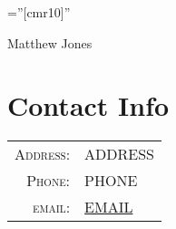 \documentclass[a4paper,10pt]{article}
\begin{document}

\pagestyle{empty} %

\font\fb=''[cmr10]'' %

\par{\centering
		{\Huge Matthew Jones
	}\bigskip\par}

\section{Contact Info}

\begin{tabular}{rl}
    \textsc{Address:}   & ADDRESS \\
    \textsc{Phone:}     & PHONE \\
    \textsc{email:}     & \href{mailto:EMAIL}{EMAIL}
\end{tabular}

\end{document}
